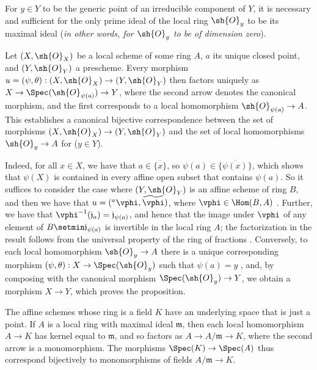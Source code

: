 \begin{corollary}[2.4.3]
\label{I.2.4.3}
For $y\in Y$ to be the generic point of an irreducible component of $Y$, it is necessary and sufficient for the only prime ideal of the local ring $\sh{O}_y$ to be its maximal ideal (\emph{in other words, for $\sh{O}_y$ to be of \emph{dimension zero}}).
\end{corollary}

\begin{proposition}[2.4.4]
\label{I.2.4.4}
Let $(X,\sh{O}_X)$ be a local scheme of some ring $A$, $a$ its unique closed point, and $(Y,\sh{O}_Y)$ a prescheme.
Every morphism $u=(\psi,\theta):(X,\sh{O}_X)\to(Y,\sh{O}_Y)$ then factors uniquely as $X\to\Spec(\sh{O}_{\psi(a)})\to Y$, where the second arrow denotes the canonical morphism, and the first corresponds to a local homomorphism $\sh{O}_{\psi(a)}\to A$.
This establishes a canonical bijective correspondence between the set of morphisms $(X,\sh{O}_X)\to(Y,\sh{O}_Y)$ and the set of local homomorphisms $\sh{O}_y\to A$ for ($y\in Y$).
\end{proposition}

Indeed, for all $x\in X$, we have that $a\in\overline{\{x\}}$, so $\psi(a)\in\overline{\{\psi(x)\}}$, which shows that $\psi(X)$ is contained in every affine open subset that contains $\psi(a)$.
So it suffices to consider the case where $(Y,\sh{O}_Y)$ is an affine scheme of ring $B$, and then we have that $u=({}^a\vphi,\widetilde{\vphi})$, where $\vphi\in\Hom(B,A)$ .
Further, we have that $\vphi^{-1}(\mathfrak{j}_a)=\mathfrak{j}_{\psi(a)}$, and hence that the image under $\vphi$ of any element of $B\setmin\mathfrak{j}_{\psi(a)}$ is invertible in the local ring $A$;
the factorization in the result follows from the universal property of the ring of fractions .
Conversely, to each local homomorphism $\sh{O}_y\to A$ there is a unique corresponding morphism $(\psi,\theta):X\to\Spec(\sh{O}_y)$ such that $\psi(a)=y$ , and, by composing with the canonical morphism $\Spec(\sh{O}_y)\to Y$, we obtain a morphism $X\to Y$, which proves the proposition.

\begin{env}[2.4.5]
\label{I.2.4.5}
The affine schemes whose ring is a field $K$ have an underlying space that is just a point.
If $A$ is a local ring with maximal ideal $\mathfrak{m}$, then each local homomorphism $A\to K$ has kernel equal to $\mathfrak{m}$, and so factors as $A\to A/\mathfrak{m}\to K$, where the second arrow is a monomorphism.
The morphisms $\Spec(K)\to\Spec(A)$ thus correspond bijectively to monomorphisms of fields $A/\mathfrak{m}\to K$.
\end{env}

